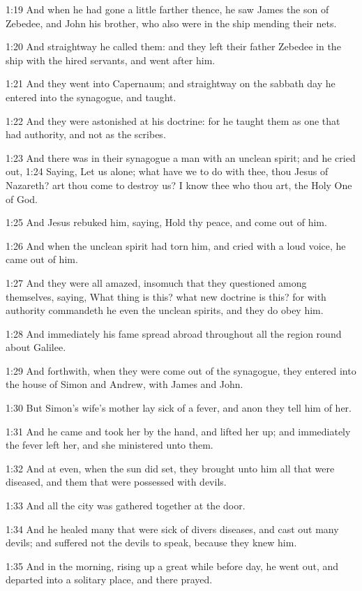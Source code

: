 1:19 And when he had gone a little farther thence, he saw James the
son of Zebedee, and John his brother, who also were in the ship
mending their nets.

1:20 And straightway he called them: and they left their father
Zebedee in the ship with the hired servants, and went after him.

1:21 And they went into Capernaum; and straightway on the sabbath day
he entered into the synagogue, and taught.

1:22 And they were astonished at his doctrine: for he taught them as
one that had authority, and not as the scribes.

1:23 And there was in their synagogue a man with an unclean spirit;
and he cried out, 1:24 Saying, Let us alone; what have we to do with
thee, thou Jesus of Nazareth? art thou come to destroy us? I know thee
who thou art, the Holy One of God.

1:25 And Jesus rebuked him, saying, Hold thy peace, and come out of
him.

1:26 And when the unclean spirit had torn him, and cried with a loud
voice, he came out of him.

1:27 And they were all amazed, insomuch that they questioned among
themselves, saying, What thing is this? what new doctrine is this? for
with authority commandeth he even the unclean spirits, and they do
obey him.

1:28 And immediately his fame spread abroad throughout all the region
round about Galilee.

1:29 And forthwith, when they were come out of the synagogue, they
entered into the house of Simon and Andrew, with James and John.

1:30 But Simon's wife's mother lay sick of a fever, and anon they tell
him of her.

1:31 And he came and took her by the hand, and lifted her up; and
immediately the fever left her, and she ministered unto them.

1:32 And at even, when the sun did set, they brought unto him all that
were diseased, and them that were possessed with devils.

1:33 And all the city was gathered together at the door.

1:34 And he healed many that were sick of divers diseases, and cast
out many devils; and suffered not the devils to speak, because they
knew him.

1:35 And in the morning, rising up a great while before day, he went
out, and departed into a solitary place, and there prayed.

